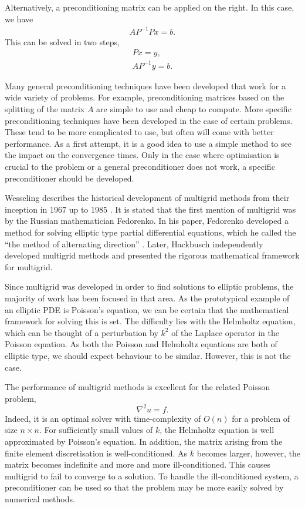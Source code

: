 Alternatively, a preconditioning matrix can be applied on the right.
In this case, we have
\begin{align}
	A P^{-1} P x = b. \label{eqn:precond_right}
\end{align}
This can be solved in two steps, 
\begin{align}
	P x = y, \\A P^{-1} y = b.
\end{align}


Many general preconditioning techniques have been developed that work for a wide variety of problems.
For example, preconditioning matrices based on the splitting of the matrix $A$ are simple to use and cheap to compute.
More specific preconditioning techniques have been developed in the case of certain problems.
These tend to be more complicated to use, but often will come with better performance.
As a first attempt, it is a good idea to use a simple method to see the impact on the convergence times.
Only in the case where optimisation is crucial to the problem or a general preconditioner does not work, a specific preconditioner should be developed.


Wesseling describes the historical development of multigrid methods from their inception in 1967 up to 1985 \cite{wesseling}.
It is stated that the first mention of multigrid was by the Russian mathematician Fedorenko.
In his paper, Fedorenko developed a method for solving elliptic type partial differential equations, which he called the ``the method of alternating direction'' \cite{fedorenko}.
Later, Hackbusch independently developed multigrid methods and presented the rigorous mathematical framework for multigrid.

Since multigrid was developed in order to find solutions to elliptic problems, the majority of work has been focused in that area.
As the prototypical example of an elliptic PDE is Poisson's equation, we can be certain that the mathematical framework for solving this is set.
The difficulty lies with the Helmholtz equation, which can be thought of a perturbation by $k^2$ of the Laplace operator in the Poisson equation.
As both the Poisson and Helmholtz equations are both of elliptic type, we should expect behaviour to be similar.
However, this is not the case.

The performance of multigrid methods is excellent for the related Poisson problem,
\begin{equation}
	\nabla^2 u = f. \label{eqn:poisson}
\end{equation}
Indeed, it is an optimal solver with time-complexity of $O(n)$ for a problem of size $n\times n$.
For sufficiently small values of $k$, the Helmholtz equation is well approximated by Poisson's equation.
In addition, the matrix arising from the finite element discretisation is well-conditioned.
As $k$ becomes larger, however, the matrix becomes indefinite and more and more ill-conditioned.
This causes multigrid to fail to converge to a solution.
To handle the ill-conditioned system, a preconditioner can be used so that the problem may be more easily solved by numerical methods.

